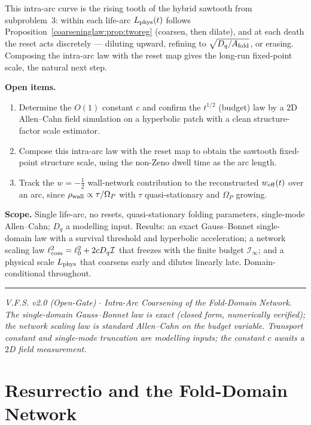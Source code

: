 \documentclass[11pt,a4paper,oneside]{book}
\newcommand{\Op}{\Omega_P}
\newcommand{\Af}{A_{\rm fold}}
\newcommand{\Dq}{D_q}
\newcommand{\lcom}{\ell_{\rm com}}
\newcommand{\Lphys}{L_{\rm phys}}
\newcommand{\Ibud}{\mathcal I}
\theoremstyle{plain}
\theoremstyle{definition}
\theoremstyle{remark}
\begin{document}
This intra-arc curve is the rising tooth of the hybrid sawtooth from subproblem~3: within each life-arc
$\Lphys(t)$ follows Proposition~\ref{coarseninglaw:prop:tworeg} (coarsen, then dilate), and at each death the reset acts
discretely --- diluting upward, refining to $\sqrt{\Dq/\Af}$, or erasing. Composing the intra-arc law with
the reset map gives the long-run fixed-point scale, the natural next step.

\textbf{Open items.}
\begin{enumerate}[leftmargin=1.6em,itemsep=2pt]
\item Determine the $O(1)$ constant $c$ and confirm the $t^{1/2}$ (budget) law by a $2$D Allen--Cahn
field simulation on a hyperbolic patch with a clean structure-factor scale estimator.
\item Compose this intra-arc law with the reset map to obtain the sawtooth fixed-point structure scale,
using the non-Zeno dwell time as the arc length.
\item Track the $w=-\tfrac12$ wall-network contribution to the reconstructed $w_{\rm eff}(t)$ over an arc,
since $\rho_{\rm wall}\propto\tau/\Op$ with $\tau$ quasi-stationary and $\Op$ growing.
\end{enumerate}

\textbf{Scope.} Single life-arc, no resets, quasi-stationary folding parameters, single-mode Allen--Cahn;
$\Dq$ a modelling input. Results: an exact Gauss--Bonnet single-domain law with a survival threshold and
hyperbolic acceleration; a network scaling law $\lcom^2=\ell_0^2+2c\Dq\Ibud$ that freezes with the finite
budget $\Ibud_\infty$; and a physical scale $\Lphys$ that coarsens early and dilutes linearly late.
Domain-conditional throughout.

\vspace{0.5em}
\hrule
\smallskip
\noindent\footnotesize\emph{V.F.S. v2.0 (Open-Gate) $\cdot$ Intra-Arc Coarsening of the Fold-Domain
Network. The single-domain Gauss--Bonnet law is exact (closed form, numerically verified); the network
scaling law is standard Allen--Cahn on the budget variable. Transport constant and single-mode truncation
are modelling inputs; the constant $c$ awaits a $2$D field measurement.}

\chapter{Resurrectio and the Fold-Domain Network}
\end{document}
